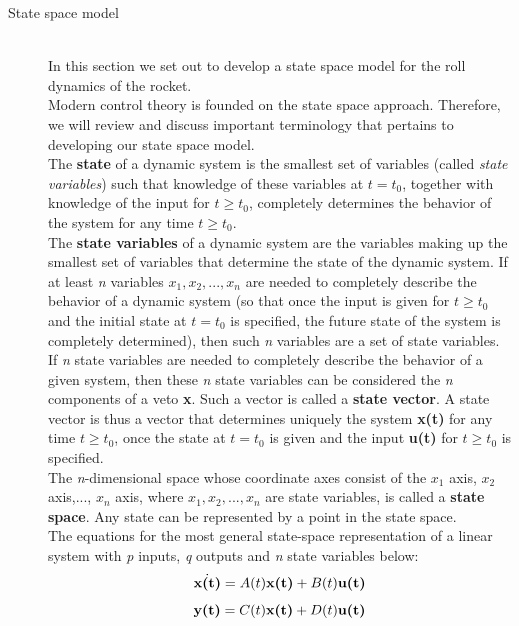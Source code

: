 \documentclass[12pt]{article}
\begin{document}
\begin{description} 
	\item[State space model] \hfill \\
		In this section we set out to develop a state space model for the roll dynamics of the rocket. \\
		
		Modern control theory is founded on the state space approach. Therefore, we will review and discuss important terminology that pertains to developing our state space model. \\
			 
		The \textbf{state} of a dynamic system is the smallest set of variables (called \textit{state variables}) such that knowledge of these variables at $t = t_{0}$, together with knowledge of the input for $ t \geq t_{0}$, completely determines the behavior of the system for any time $t \geq t_{0}$. \cite{MCE}\\
			
		The \textbf{state variables} of a dynamic system are the variables making up the smallest set of variables that determine the state of the dynamic system. If at least \textit{n} variables \textit{$x_{1}, x_{2},..., x_{n}$} are needed to completely describe the behavior of a dynamic system (so that once the input is given for $t \geq t_{0}$ and the initial state at $t = t_{0}$ is specified, the future state of the system is completely determined), then such \textit{n} variables are a set of state variables. \cite{MCE}\\
			
		If \textit{n} state variables are needed to completely describe the behavior of a given system, then these \textit{n} state variables can be considered the \textit{n} components of a veto \textbf{x}. Such a vector is called a \textbf{state vector}. A state vector is thus a vector that determines uniquely the system \textbf{x(t)} for any time $t \geq t_{0}$, once the state at $t = t_{0}$ is given and the input \textbf{u(t)} for $t \geq t_{0}$ is specified. \cite{MCE} \\
			
		The \textit{n}-dimensional space whose coordinate axes consist of the \textit{$x_{1}$} axis, \textit{$x_{2}$} axis,..., \textit{$x_{n}$} axis, where \textit{$x_{1}, x_{2},..., x_{n}$} are state variables, is called a \textbf{state space}. Any state can be represented by a point in the state space. \cite{MCE} \\
			
		The equations for the most general state-space representation of a linear system with \textit{p} inputs, \textit{q} outputs and \textit{n} state variables below:\\
			\begin{equation}
				\dot{\textbf{x(t)}} = A(t)\textbf{x(t)} + B(t)\textbf{u(t)}\\
			\end{equation}
			\begin{equation}
				\textbf{y(t)} = C(t)\textbf{x(t)} + D(t)\textbf{u(t)}\\
			\end{equation}


\end{description}
\end{document}

